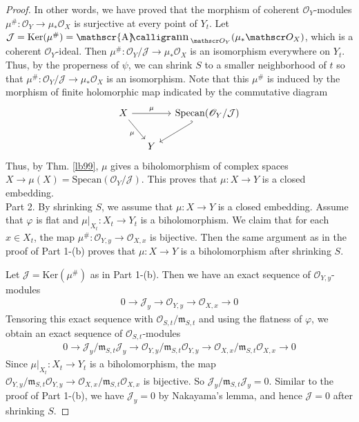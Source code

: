 \documentclass[12pt,b5paper,notitlepage]{report}
\theoremstyle{definition}
\theoremstyle{plain}
\DeclareMathOperator{\sann}{\mathscr{A}\text{\kern -3pt {\calligra\large nn}}\,}
\newcommand{\mc}{\mathcal}
\newcommand{\scr}{\mathscr}
\newcommand{\Ker}{\mathrm{Ker}}
\newcommand{\Specan}{\mathrm{Specan}}
\newcommand{\mk}{\mathfrak m}
\numberwithin{equation}{section}
\begin{document}
\begin{proof}
In other words, we have proved that the morphism of coherent $\scr O_Y$-modules $\mu^\#:\scr O_Y\rightarrow\mu_*\scr O_X$ is surjective at every point of $Y_t$. Let $\mc J=\Ker(\mu^\#)=\sann_{\scr O_Y}(\mu_*\scr O_X)$, which is a coherent $\scr O_Y$-ideal. Then $\mu^\#:\scr O_{Y}/\mc J\rightarrow\mu_*\scr O_X$ is an isomorphism everywhere on $Y_t$. Thus, by the properness of $\psi$, we can shrink $S$ to a smaller neighborhood of $t$ so that $\mu^\#:\scr O_{Y}/\mc J\rightarrow\mu_*\scr O_X$ is an isomorphism. Note that this $\mu^\#$ is induced by the morphism of finite holomorphic map indicated by the commutative diagram
\begin{equation}
\begin{tikzcd}[column sep=small]
X \arrow[rr,"\mu"] \arrow[rd,"\mu"'] &   & \Specan(\scr O_Y/\mc J) \arrow[ld,hook'] \\
                        & Y &             
\end{tikzcd}
\end{equation}
Thus, by Thm. \ref{lb99}, $\mu$ gives a biholomorphism of complex spaces $X\rightarrow\mu(X)=\Specan(\scr O_Y/\mc J)$. This proves that $\mu:X\rightarrow Y$ is a closed embedding.\\[-1ex]

Part 2. By shrinking $S$, we assume that $\mu:X\rightarrow Y$ is a closed embedding. Assume that $\varphi$ is flat and $\mu|_{X_t}:X_t\rightarrow Y_t$ is a biholomorphism. We claim that for each $x\in X_t$, the map $\mu^\#:\scr O_{Y,y}\rightarrow\scr O_{X,x}$ is bijective. Then the same argument as in the proof of Part 1-(b) proves that $\mu:X\rightarrow Y$ is a biholomorphism after shrinking $S$. 

Let $\mc J=\Ker(\mu^\#)$ as in Part 1-(b). Then we have an exact sequence of $\scr O_{Y,y}$-modules
\begin{align*}
0\rightarrow\mc J_y\rightarrow \scr O_{Y,y}\rightarrow\scr O_{X,x}\rightarrow0
\end{align*} 
Tensoring this exact sequence with $\scr O_{S,t}/\mk_{S,t}$ and using the flatness of $\varphi$, we obtain an exact sequence of $\scr O_{S,t}$-modules
\begin{align*}
0\rightarrow\mc J_y/\mk_{S,t}\mc J_y\rightarrow \scr O_{Y,y}/\mk_{S,t}\scr O_{Y,y}\rightarrow\scr O_{X,x}/\mk_{S,t}\scr O_{X,x}\rightarrow0
\end{align*}
Since $\mu|_{X_t}:X_t\rightarrow Y_t$ is a biholomorphism, the map $\scr O_{Y,y}/\mk_{S,t}\scr O_{Y,y}\rightarrow\scr O_{X,x}/\mk_{S,t}\scr O_{X,x}$ is bijective. So $\mc J_y/\mk_{S,t}\mc J_y=0$. Similar to the proof of Part 1-(b), we have $\mc J_y=0$ by Nakayama's lemma, and hence $\mc J=0$ after shrinking $S$. 
\end{proof}
\end{document}
